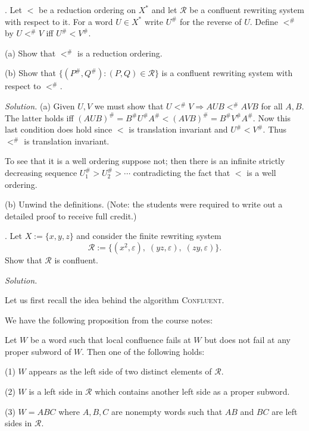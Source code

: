 \documentclass[10pt,a4paper,reqno]{amsart}
\begin{document}
\bigskip

. Let $<$ be a reduction ordering on $X^*$ and let $\mathcal{R}$ be
a confluent rewriting system with respect to it. For a word $U\in X^*$ write
$U^\#$ for the reverse of $U$. Define $<^\#$ by $U <^\# V$ iff $U^\# < V^\#$.

(a) Show that $<^\#$ is a reduction ordering.

(b) Show that $\{(P^\#,Q^\#) : (P,Q)\in \mathcal{R}\}$ is a confluent rewriting
system with respect to $<^\#$.

\bigskip

\emph{Solution.} (a) Given $U,V$ we must show that $U <^\# V \Rightarrow AUB
<^\# AVB$ for all $A,B$. The latter holds iff $(AUB)^\# = B^\# U^\# A^\# <
(AVB)^\# = B^\# V^\# A^\#$. Now this last condition does hold since $<$ is
translation invariant and $U^\# < V^\#.$ Thus $<^\#$ is translation invariant.

To see that it is a well ordering suppose not; then there is an infinite
strictly decreasing sequence $U_1^\# > U_2^\# > \cdots$ contradicting the fact
that $<$ is a well ordering.

(b) Unwind the definitions. (Note: the students were required to write out a
detailed proof to receive full credit.)

\bigskip

. Let $X := \{x,y,z\}$ and consider the finite rewriting system
$$\mathcal{R} := \{(x^2, \varepsilon),\; (yz, \varepsilon),\; (zy,\varepsilon)
\}.$$ Show that $\mathcal{R}$ is confluent.

\bigskip

\emph{Solution.}

Let us first recall the idea behind the algorithm \textsc{Confluent}.

We have the following proposition from the course notes:

\begin{prop} Let $W$ be a word such that local confluence fails at $W$ but does
    not fail at any proper subword of $W$. Then one of the following holds:

    (1) $W$ appears as the left side of two distinct elements of $\mathcal{R}$.

    (2) $W$ is a left side in $\mathcal{R}$ which contains another left side as a proper subword.

    (3) $W = ABC$ where $A,B,C$ are nonempty words such that $AB$ and $BC$ are left sides in $\mathcal{R}$.
\end{prop}
\end{document}
